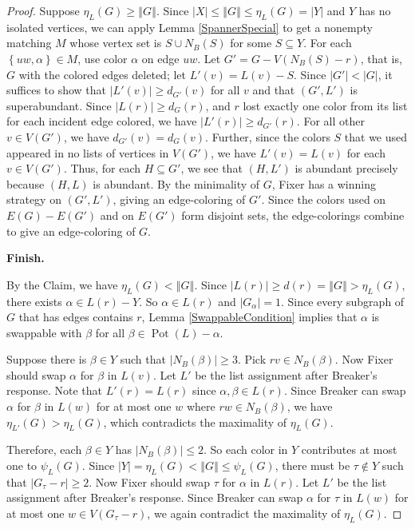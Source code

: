 \documentclass[12pt,reqno]{amsart}
\theoremstyle{plain}
\theoremstyle{definition}
\theoremstyle{remark}
\newcommand{\set}[1]{\left\{ #1 \right\}}
\newcommand{\card}[1]{\left|#1\right|}
\newcommand{\size}[1]{\left\Vert#1\right\Vert}
\newcommand{\pot}{\operatorname{Pot}}
\begin{document}
\begin{proof}
Suppose $\eta_L(G) \ge \size{G}$.  Since $\card{X} \le \size{G} \le \eta_L(G) =
\card{Y}$ and $Y$ has no isolated vertices, we can apply Lemma
\ref{SpannerSpecial} to get a nonempty matching $M$ whose vertex set is $S \cup
N_B(S)$ for some $S \subseteq Y$.  For each $\set{uw, \alpha} \in M$, use color
$\alpha$ on edge $uw$.  Let $G' = G - V(N_B(S) - r)$, that is, $G$ with
the colored edges deleted; let $L'(v) = L(v) - S$.
Since $\card{G'}<\card{G}$, it suffices to show that $\card{L'(v)}\ge
d_{G'}(v)$ for all $v$ and that $(G',L')$ is superabundant.  Since
$\card{L(r)}\ge d_G(r)$, and $r$ lost exactly one color from its list for each
incident edge colored, we have
$\card{L'(r)}\ge d_{G'}(r)$.  For all other $v\in V(G')$, we have
$d_{G'}(v)=d_{G}(v)$.  Further, since the colors $S$ that we used appeared in
no lists of vertices in $V(G')$, we have $L'(v) = L(v)$ for each $v\in V(G')$. 
Thus, for each $H\subseteq G'$, we see that $(H,L')$ is abundant precisely
because $(H,L)$ is abundant.  By the minimality of $G$, Fixer has a winning
strategy on $(G',L')$, giving an edge-coloring of $G'$.  Since the colors used
on $E(G)-E(G')$ and on $E(G')$ form disjoint sets, the edge-colorings combine
to give an edge-coloring of $G$.

\bigskip

\noindent\textbf{Finish.}

By the Claim, we have $\eta_L(G) < \size{G}$.  Since $\card{L(r)} \ge d(r) =
\size{G}>\eta_L(G)$, there exists $\alpha \in L(r) - Y$.  So $\alpha \in L(r)$
and $\card{G_\alpha} = 1$. Since every subgraph of $G$ that has edges contains
$r$, Lemma \ref{SwappableCondition} implies that $\alpha$ is swappable with
$\beta$ for all $\beta \in \pot(L) - \alpha$.

Suppose there is $\beta \in Y$ such that $\card{N_B(\beta)} \ge 3$.  Pick $rv \in N_B(\beta)$.  Now Fixer should swap $\alpha$ for $\beta$ in $L(v)$.  Let $L'$ be the list assignment after Breaker's response. Note that $L'(r) = L(r)$ since $\alpha, \beta \in L(r)$.  Since Breaker can swap $\alpha$ for $\beta$ in $L(w)$ for at most one $w$ where $rw \in N_B(\beta)$, we have $\eta_{L'}(G) > \eta_L(G)$, which contradicts the maximality of $\eta_L(G)$.

Therefore, each $\beta \in Y$ has $\card{N_B(\beta)} \le 2$.  So each color
in $Y$ contributes at most one to $\psi_L(G)$.  Since $\card{Y} = \eta_L(G)
< \size{G}\le \psi_L(G)$, there must be $\tau \not \in Y$ such that
$\card{G_\tau - r} \ge 2$.  Now Fixer should swap $\tau$ for $\alpha$ in
$L(r)$. Let $L'$ be the list assignment after Breaker's response.  Since
Breaker can swap $\alpha$ for $\tau$ in $L(w)$ for at most one $w \in V(G_\tau
- r)$, we again contradict the maximality of $\eta_L(G)$.
\end{proof}
\end{document}
